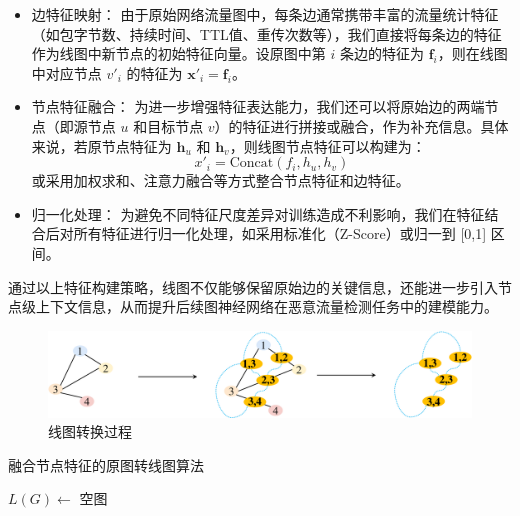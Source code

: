 \documentclass[promaster]{thesis-uestc}
\begin{document}
\begin{itemize}
    \item 边特征映射： 由于原始网络流量图中，每条边通常携带丰富的流量统计特征（如包字节数、持续时间、TTL值、重传次数等），我们直接将每条边的特征作为线图中新节点的初始特征向量。设原图中第 \(i\) 条边的特征为 \( \mathbf{f}_i \)，则在线图中对应节点 \(v'_i\) 的特征为 \( \mathbf{x}'_i = \mathbf{f}_i \)。
    
    \item 节点特征融合： 为进一步增强特征表达能力，我们还可以将原始边的两端节点（即源节点 \(u\) 和目标节点 \(v\)）的特征进行拼接或融合，作为补充信息。具体来说，若原节点特征为 \( \mathbf{h}_u \) 和 \( \mathbf{h}_v \)，则线图节点特征可以构建为：
    \begin{equation}
         x'_i = \text{Concat}(f_i, h_u, h_v)
    \end{equation}
    或采用加权求和、注意力融合等方式整合节点特征和边特征。
    
    \item 归一化处理： 为避免不同特征尺度差异对训练造成不利影响，我们在特征结合后对所有特征进行归一化处理，如采用标准化（Z-Score）或归一到 [0,1] 区间。
\end{itemize}

通过以上特征构建策略，线图不仅能够保留原始边的关键信息，还能进一步引入节点级上下文信息，从而提升后续图神经网络在恶意流量检测任务中的建模能力。

\begin{figure}[h!]
    \centering
    \includegraphics[width=1\linewidth]{./pic/线图转换.pdf}
    \caption{线图转换过程}
    \label{lineGraph_transport}
\end{figure}
\begin{algorithm}[h!]
    \caption{融合节点特征的原图转线图算法}
    \label{transformLineGraphWithFeature}
    
    $L(G) \gets$ 空图\;
    
    
    \;
    \end{algorithm}
    
\end{document}
